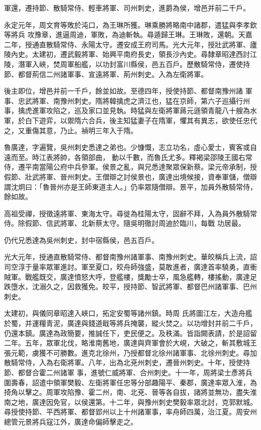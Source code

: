 \begin{pinyinscope}
 軍還，遷持節、散騎常侍、輕車將軍、司州刺史，進爵為侯，增邑并前二千戶。



 永定元年，周文育等敗於沌口，為王琳所獲。琳乘勝將略南中諸郡，遣猛與李孝欽等將兵
 攻豫章，進逼周迪，軍敗，為迪斬執。尋遁歸王琳。王琳敗，還朝。天嘉二年，授通直散騎常侍、永陽太守。遷安成王府司馬。光大元年，授壯武將軍、廬陵內史。太建初，遷武毅將軍、始興平南府長史，領長沙內史。尋隸章昭達西討江陵，潛軍入峽，焚周軍船艦，以功封富川縣侯，邑五百戶。歷散騎常侍，遷使持節、都督荊信二州諸軍事、宣遠將軍、荊州刺史。入為左衛將軍。



 後主即位，增邑并前一千戶，餘並如故。至德四年，授使持節、都督南豫州諸
 軍事、忠武將軍、南豫州刺史。隋將韓擒虎之濟江也，猛在京師，第六子巡攝行州事，擒虎進軍攻陷之，巡及家口並見執。時猛與左衛將軍蔣元遜領青龍八十艘為水軍，於白下遊弈，以禦隋六合兵，後主知猛妻子在隋軍，懼其有異志，欲使任忠代之，又重傷其意，乃止。禎明三年入于隋。



 魯廣達，字遍覽，吳州刺史悉達之弟也。少慷慨，志立功名，虛心愛士，賓客或自遠而至。時江表將帥，各領部曲，
 動以千數，而魯氏尤多。釋褐梁邵陵王國右常侍，遷平南當陽公府中兵參軍。侯景之亂，與兄悉達聚眾保新蔡。梁元帝承制，授假節、壯武將軍、晉州刺史。王僧辯之討侯景也，廣達出境候接，資奉軍儲，僧辯謂沈炯曰：「魯晉州亦是王師東道主人。」仍率眾隨僧辯。景平，加員外散騎常侍，餘如故。



 高祖受禪，授徵遠將軍、東海太守。尋徙為桂陽太守，固辭不拜，入為員外散騎常侍。除假節、信武將軍、北新蔡太守。隨吳明徹討周迪於臨川，每戰
 功居最。



 仍代兄悉達為吳州刺史，封中宿縣侯，邑五百戶。



 光大元年，授通直散騎常侍、都督南豫州諸軍事、南豫州刺史。華皎稱兵上流，詔司空淳于量率眾軍進討。軍至夏口，皎舟師強盛，莫敢進者，廣達首率驍勇，直衝賊軍。戰艦既交，廣達憤怒大呼，登艦樓，獎勵士卒，風急艦轉，樓搖動，廣達足跌墮水，沈溺久之，因救獲免。皎平，授持節、智武將軍、都督巴州諸軍事、巴州刺史。



 太建初，與儀同章昭達入峽口，拓定安蜀等諸州鎮。時周
 氏將圖江左，大造舟艦於蜀，并運糧青泥，廣達與錢道戢等將兵掩襲，縱火焚之。以功增封并前二千戶，仍還本鎮。廣達為政簡要，推誠任下，吏民便之。及秩滿。皆詣闕表請，於是詔留二年。五年，眾軍北伐，略淮南舊地，廣達與齊軍會於大峴，大破之，斬其敷城王張元範，虜獲不可勝數。進克北徐州，乃授都督北徐州諸軍事、北徐州刺史。尋加散騎常侍，入為右衛將軍。八年，出為北兗州刺史，遷晉州刺史。十年，授使持節、都督合霍二州諸軍
 事，進號仁威將軍、合州刺史。十一年，周將梁士彥將兵圍壽春，詔遣中領軍樊毅、左衛將軍任忠等分部趣陽平、秦郡，廣達率眾入淮，為掎角以擊之。周軍攻陷豫、霍二州，南、北兗、晉等各自拔，諸將並無功，盡失淮南之地，廣達因免官，以侯還第。十二年，與豫州刺史樊毅率眾北討，克郭默城。尋授使持節、平西將軍、都督郢州以上十州諸軍事，率舟師四萬，治江夏。周安州總管元景將兵寇江外，廣達命偏師擊走之。




\end{pinyinscope}

